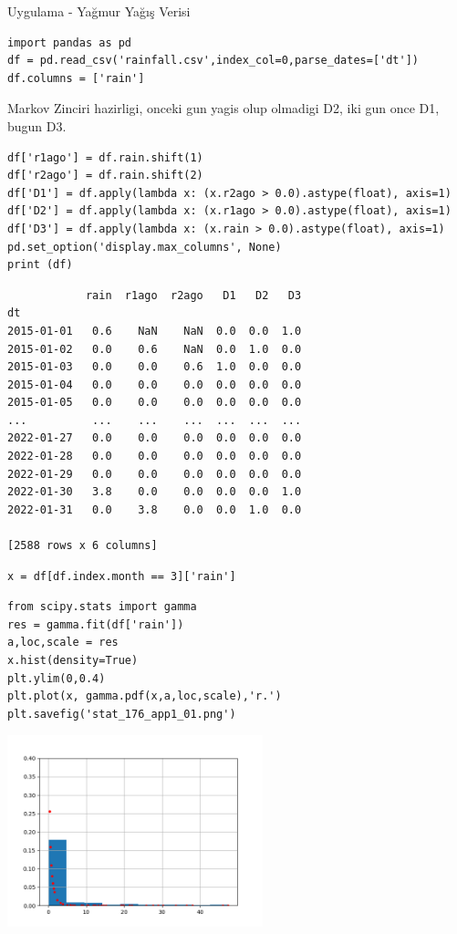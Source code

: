 \documentclass[12pt,fleqn]{article}\usepackage{../../common}
\begin{document}
Uygulama - Yağmur Yağış Verisi

\begin{verbatim}
import pandas as pd
df = pd.read_csv('rainfall.csv',index_col=0,parse_dates=['dt'])
df.columns = ['rain']
\end{verbatim}

Markov Zinciri hazirligi, onceki gun yagis olup olmadigi D2, iki gun once D1,
bugun D3.

\begin{verbatim}
df['r1ago'] = df.rain.shift(1)
df['r2ago'] = df.rain.shift(2)
df['D1'] = df.apply(lambda x: (x.r2ago > 0.0).astype(float), axis=1)
df['D2'] = df.apply(lambda x: (x.r1ago > 0.0).astype(float), axis=1)
df['D3'] = df.apply(lambda x: (x.rain > 0.0).astype(float), axis=1)
pd.set_option('display.max_columns', None)
print (df)
\end{verbatim}

\begin{verbatim}
            rain  r1ago  r2ago   D1   D2   D3
dt                                           
2015-01-01   0.6    NaN    NaN  0.0  0.0  1.0
2015-01-02   0.0    0.6    NaN  0.0  1.0  0.0
2015-01-03   0.0    0.0    0.6  1.0  0.0  0.0
2015-01-04   0.0    0.0    0.0  0.0  0.0  0.0
2015-01-05   0.0    0.0    0.0  0.0  0.0  0.0
...          ...    ...    ...  ...  ...  ...
2022-01-27   0.0    0.0    0.0  0.0  0.0  0.0
2022-01-28   0.0    0.0    0.0  0.0  0.0  0.0
2022-01-29   0.0    0.0    0.0  0.0  0.0  0.0
2022-01-30   3.8    0.0    0.0  0.0  0.0  1.0
2022-01-31   0.0    3.8    0.0  0.0  1.0  0.0

[2588 rows x 6 columns]
\end{verbatim}


\begin{verbatim}
x = df[df.index.month == 3]['rain']
\end{verbatim}

\begin{verbatim}
from scipy.stats import gamma
res = gamma.fit(df['rain'])
a,loc,scale = res  
x.hist(density=True)
plt.ylim(0,0.4)
plt.plot(x, gamma.pdf(x,a,loc,scale),'r.')
plt.savefig('stat_176_app1_01.png')
\end{verbatim}

\includegraphics[width=20em]{stat_176_app1_01.png}
\end{document}
